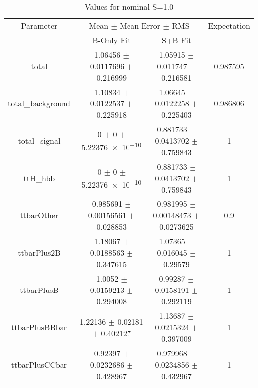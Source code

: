 \begin{table}
\centering
\caption{Values for nominal S=1.0}
\begin{tabular}{cccc}
\toprule
Parameter & \multicolumn{2}{c}{Mean $\pm$ Mean Error $\pm$ RMS} & Expectation\\
 & B-Only Fit & S+B Fit & \\
\midrule
total & \num{1.06456} $\pm$ \num{0.0117696} $\pm$ \num{0.216999} & \num{1.05915} $\pm$ \num{0.011747} $\pm$ \num{0.216581} & \num{0.987595}\\
total\_background & \num{1.10834} $\pm$ \num{0.0122537} $\pm$ \num{0.225918} & \num{1.06645} $\pm$ \num{0.0122258} $\pm$ \num{0.225403} & \num{0.986806}\\
total\_signal & \num{0} $\pm$ \num{0} $\pm$ \num{5.22376e-10} & \num{0.881733} $\pm$ \num{0.0413702} $\pm$ \num{0.759843} & \num{1}\\
ttH\_hbb & \num{0} $\pm$ \num{0} $\pm$ \num{5.22376e-10} & \num{0.881733} $\pm$ \num{0.0413702} $\pm$ \num{0.759843} & \num{1}\\
ttbarOther & \num{0.985691} $\pm$ \num{0.00156561} $\pm$ \num{0.028853} & \num{0.981995} $\pm$ \num{0.00148473} $\pm$ \num{0.0273625} & \num{0.9}\\
ttbarPlus2B & \num{1.18067} $\pm$ \num{0.0188563} $\pm$ \num{0.347615} & \num{1.07365} $\pm$ \num{0.016045} $\pm$ \num{0.29579} & \num{1}\\
ttbarPlusB & \num{1.0052} $\pm$ \num{0.0159213} $\pm$ \num{0.294008} & \num{0.99287} $\pm$ \num{0.0158191} $\pm$ \num{0.292119} & \num{1}\\
ttbarPlusBBbar & \num{1.22136} $\pm$ \num{0.02181} $\pm$ \num{0.402127} & \num{1.13687} $\pm$ \num{0.0215324} $\pm$ \num{0.397009} & \num{1}\\
ttbarPlusCCbar & \num{0.92397} $\pm$ \num{0.0232686} $\pm$ \num{0.428967} & \num{0.979968} $\pm$ \num{0.0234856} $\pm$ \num{0.432967} & \num{1}\\
\bottomrule
\end{tabular}
\end{table}